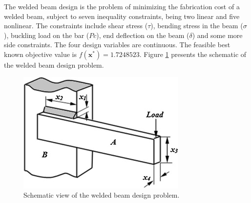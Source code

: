 
The welded beam design \cite{WB} is the problem of minimizing the fabrication cost of a welded beam, subject to seven inequality constraints, being two linear and five nonlinear. The constraints include shear stress ($\tau$), bending stress in the beam ($\sigma$), buckling load on the bar ($Pc$), end deflection on the beam ($\delta$) and some more side constraints. The four design variables are continuous. The feasible best known objective value is $f(\bm{x}^*) = 1.7248523$. Figure \ref{fig:WB} presents the schematic of the welded beam design problem. %


%

\vspace{0.5cm}

\begin{figure}[h]
    \begin{center}
    \includegraphics[scale=0.7]{img/Problems/WB.jpg}
    \end{center}
    \captionsetup{justification=centering}
    \caption{Schematic view of the welded beam design problem.}\label{fig:WB}
\end{figure}